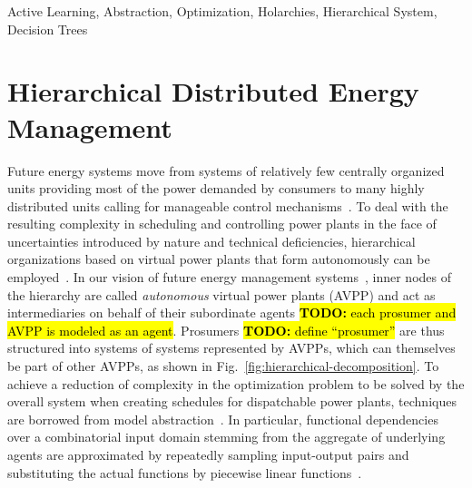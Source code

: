 \documentclass[conference]{IEEEtran}
\newcommand{\todot}[1]{\sethlcolor{highlightyellow} \hl{\textbf{TODO:} #1}}
\newcommand{\noteg}[1]{\sethlcolor{highlightgreen} \hl{\textbf{NOTE:} #1}}
\newcommand{\fref}[1]{Fig.~\ref{#1}}
\begin{document}
\begin{IEEEkeywords}
Active Learning, Abstraction, Optimization, Holarchies, Hierarchical System, Decision Trees
\end{IEEEkeywords}

\section{Hierarchical Distributed Energy Management}
Future energy systems move from systems of relatively few centrally organized units
providing most of the power demanded by consumers to many highly distributed units calling
for manageable control mechanisms~\cite{Ramchurn2012}.
To deal with the resulting complexity in scheduling and controlling power plants in the face of 
uncertainties introduced by nature and technical deficiencies, hierarchical organizations based on virtual power plants
that form autonomously can be employed~\cite{Anders-TAAS-2015,niesse2014conjoint}.
In our vision of future energy management systems~\cite{Anders-TAAS-2015}, inner nodes of the hierarchy are called  \emph{autonomous} virtual power plants (AVPP) and act as intermediaries on behalf of their subordinate
agents \todot{each prosumer and AVPP is modeled as an agent}. Prosumers \todot{define ``prosumer''} are thus structured into systems of systems represented by AVPPs, which can themselves be part of other AVPPs, as 
shown in \fref{fig:hierarchical-decomposition}. To achieve a reduction of complexity in the optimization 
problem to be solved by the overall system when creating schedules for dispatchable power plants, techniques are borrowed from model abstraction~\cite{Frantz_Taxonomy}. 
In particular, functional dependencies over a combinatorial input domain stemming from the
aggregate of underlying agents are approximated by repeatedly sampling input-output pairs
and substituting the actual functions by piecewise linear functions~\cite{Schiendorfer2014}. 
\end{document}
